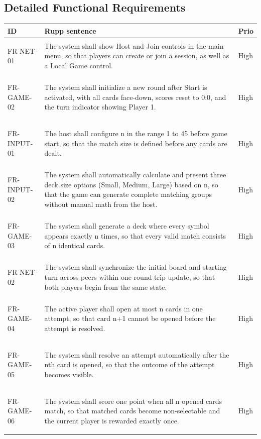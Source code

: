 \documentclass[a4paper,12pt]{article}
\begin{document}
    \subsection{Detailed Functional Requirements}
    \begin{longtable}{|p{2.1cm}|p{11.6cm}|p{1.3cm}|}
        \hline
        \textbf{ID} & \textbf{Rupp sentence} & \textbf{Prio} \\
        \hline
        \hypertarget{req:FR-NET-01}{FR-NET-01} & The system shall show Host and Join controls in the main menu, so that players can create or join a session, as well as a Local Game control. & High \\
        \hline
        \hypertarget{req:FR-GAME-02}{FR-GAME-02} & The system shall initialize a new round after Start is activated, with all cards face-down, scores reset to 0:0, and the turn indicator showing Player 1. & High \\
        \hline
        \hypertarget{req:FR-INPUT-01}{FR-INPUT-01} & The host shall configure n in the range 1 to 45 before game start, so that the match size is defined before any cards are dealt. & High \\
        \hline
        \hypertarget{req:FR-INPUT-02}{FR-INPUT-02} & The system shall automatically calculate and present three deck size options (Small, Medium, Large) based on n, so that the game can generate complete matching groups without manual math from the host. & High \\
        \hline
        \hypertarget{req:FR-GAME-03}{FR-GAME-03} & The system shall generate a deck where every symbol appears exactly n times, so that every valid match consists of n identical cards. & High \\
        \hline
        \hypertarget{req:FR-NET-02}{FR-NET-02} & The system shall synchronize the initial board and starting turn across peers within one round-trip update, so that both players begin from the same state. & High \\
        \hline
        \hypertarget{req:FR-GAME-04}{FR-GAME-04} & The active player shall open at most n cards in one attempt, so that card n+1 cannot be opened before the attempt is resolved. & High \\
        \hline
        \hypertarget{req:FR-GAME-05}{FR-GAME-05} & The system shall resolve an attempt automatically after the nth card is opened, so that the outcome of the attempt becomes visible. & High \\
        \hline
        \hypertarget{req:FR-GAME-06}{FR-GAME-06} & The system shall score one point when all n opened cards match, so that matched cards become non-selectable and the current player is rewarded exactly once. & High \\

\end{longtable}
\end{document}
